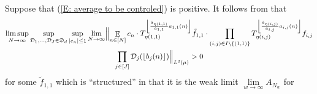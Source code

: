\documentclass[11pt]{amsart}
\theoremstyle{definition}
\DeclareMathOperator*{\E}{\mathbb{E}}
\newcommand{\CD}{{\mathcal D}}
\newcommand{\FD}{{\mathfrak D}}
\newcommand{\1}{{\mathbf{1}}}
\newcommand{\floor}[1]{{\left \lfloor #1 \right \rfloor}}
\begin{document}
     Suppose  that (\ref{E: average to be controled}) is positive.
     It follows from  \cite[Lemma 11.7]{DKKST24} that 
     \begin{multline*}
         \limsup_{N\to\infty}\sup_{\substack{
         \CD_1, \ldots, \CD_J \in \FD_d}} \sup_{|c_n|\leq 1}\lim_{N\to\infty}\Bigl\Vert\E_{n\in[N]}c_{n}\cdot T_{\eta(1,1)}^{\floor{\frac{\hat{a}_{\eta(1,1)}}{\hat{a}_{1,1}}a_{1,1}(n)}}\tilde{f}_{1,1}\cdot\prod_{(i,j)\in I\backslash\{(1,1)\}}T_{\eta(i,j)}^{\floor{\frac{\hat{a}_{\eta(i,j)}}{\hat{a}_{i,j}}a_{i,j}(n)}}f_{i,j}\\
         \prod_{j\in[J]}\mathcal{D}_{j}(\floor{b_{j}(n)})\Bigr\Vert_{L^2(\mu)}>0
     \end{multline*}
     for some $\tilde{f}_{1,1}$ which is ``structured'' in that it is the weak limit $\lim\limits_{w\to\infty} A_{N_{w}}$ for 
\end{document}
